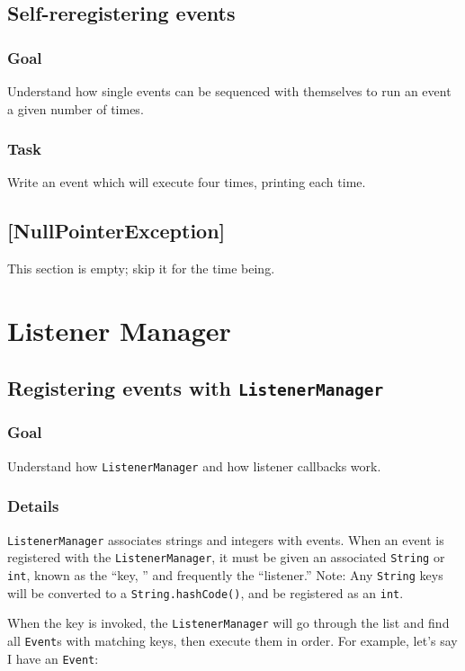 \documentclass[a4paper]{article}
\begin{document}
\subsection{Self-reregistering events}
\subsubsection{Goal} Understand how single events can be sequenced with themselves to run an event a given number of times.
\setcounter{subsubsection}{2}\subsubsection{Task} Write an event which will execute four times, printing each time.

\subsection{[NullPointerException]} This section is empty; skip it for the time being.


\pagebreak\section{Listener Manager}\setcounter{subsection}{17}
\subsection{Registering events with \lstinline{ListenerManager}}
\subsubsection{Goal} Understand how \lstinline{ListenerManager} and how listener callbacks work.
\subsubsection{Details} \lstinline{ListenerManager} associates strings and integers with events. When an event is registered with the \lstinline{ListenerManager}, it must be given an associated \lstinline{String} or \lstinline{int}, known as the ``key, '' and frequently the ``listener.'' Note: Any \lstinline{String} keys will be converted to a \lstinline{String.hashCode()}, and be registered as an \lstinline{int}.

When the key is invoked, the \lstinline{ListenerManager} will go through the list and find all \lstinline{Event}s with matching keys, then execute them in order. For example, let's say I have an \lstinline{Event}:
\end{document}
